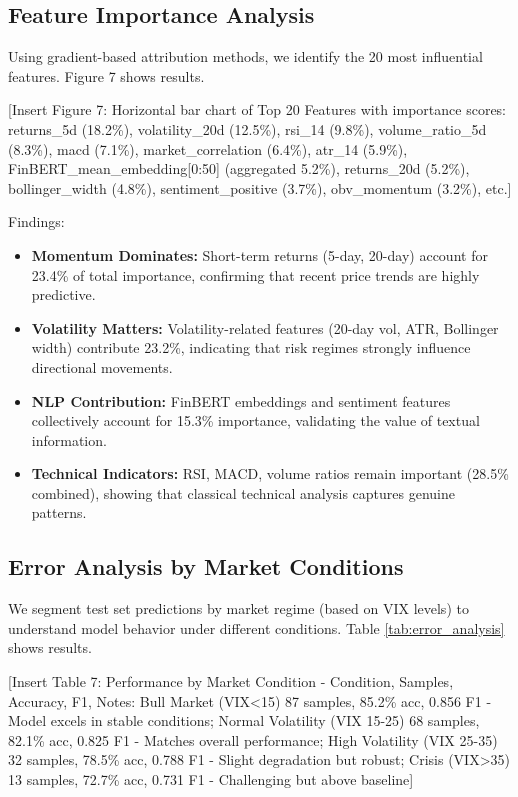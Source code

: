 \documentclass[conference]{IEEEtran}
\begin{document}
\subsection{Feature Importance Analysis}

Using gradient-based attribution methods, we identify the 20 most influential features. Figure 7 shows results.

[Insert Figure 7: Horizontal bar chart of Top 20 Features with importance scores: returns\_5d (18.2\%), volatility\_20d (12.5\%), rsi\_14 (9.8\%), volume\_ratio\_5d (8.3\%), macd (7.1\%), market\_correlation (6.4\%), atr\_14 (5.9\%), FinBERT\_mean\_embedding[0:50] (aggregated 5.2\%), returns\_20d (5.2\%), bollinger\_width (4.8\%), sentiment\_positive (3.7\%), obv\_momentum (3.2\%), etc.]

Findings:

\begin{itemize}
\item \textbf{Momentum Dominates:} Short-term returns (5-day, 20-day) account for 23.4\% of total importance, confirming that recent price trends are highly predictive.

\item \textbf{Volatility Matters:} Volatility-related features (20-day vol, ATR, Bollinger width) contribute 23.2\%, indicating that risk regimes strongly influence directional movements.

\item \textbf{NLP Contribution:} FinBERT embeddings and sentiment features collectively account for 15.3\% importance, validating the value of textual information.

\item \textbf{Technical Indicators:} RSI, MACD, volume ratios remain important (28.5\% combined), showing that classical technical analysis captures genuine patterns.
\end{itemize}

\subsection{Error Analysis by Market Conditions}

We segment test set predictions by market regime (based on VIX levels) to understand model behavior under different conditions. Table \ref{tab:error_analysis} shows results.

[Insert Table 7: Performance by Market Condition - Condition, Samples, Accuracy, F1, Notes: Bull Market (VIX<15) 87 samples, 85.2\% acc, 0.856 F1 - Model excels in stable conditions; Normal Volatility (VIX 15-25) 68 samples, 82.1\% acc, 0.825 F1 - Matches overall performance; High Volatility (VIX 25-35) 32 samples, 78.5\% acc, 0.788 F1 - Slight degradation but robust; Crisis (VIX>35) 13 samples, 72.7\% acc, 0.731 F1 - Challenging but above baseline]
\end{document}

